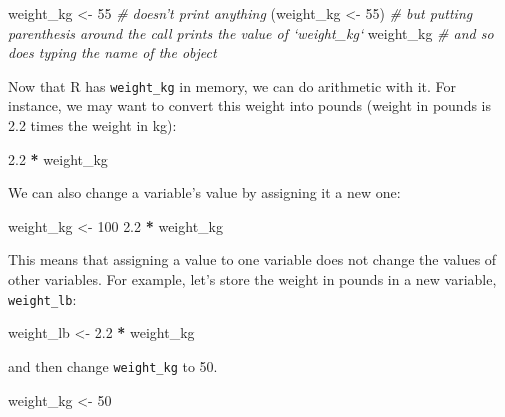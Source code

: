\documentclass[
]{book}
\newenvironment{Shaded}{\begin{snugshade}}{\end{snugshade}}
\newcommand{\CommentTok}[1]{\textcolor[rgb]{0.56,0.35,0.01}{\textit{#1}}}
\newcommand{\DecValTok}[1]{\textcolor[rgb]{0.00,0.00,0.81}{#1}}
\newcommand{\FloatTok}[1]{\textcolor[rgb]{0.00,0.00,0.81}{#1}}
\newcommand{\NormalTok}[1]{#1}
\newcommand{\OperatorTok}[1]{\textcolor[rgb]{0.81,0.36,0.00}{\textbf{#1}}}
\newcommand{\StringTok}[1]{\textcolor[rgb]{0.31,0.60,0.02}{#1}}
\begin{document}
\begin{Shaded}
\begin{Highlighting}[]
\NormalTok{weight_kg <-}\StringTok{ }\DecValTok{55}    \CommentTok{# doesn't print anything}
\NormalTok{(weight_kg <-}\StringTok{ }\DecValTok{55}\NormalTok{)  }\CommentTok{# but putting parenthesis around the call prints the value of `weight_kg`}
\NormalTok{weight_kg          }\CommentTok{# and so does typing the name of the object}
\end{Highlighting}
\end{Shaded}

Now that R has \texttt{weight\_kg} in memory, we can do arithmetic with it. For
instance, we may want to convert this weight into pounds (weight in pounds is 2.2 times the weight in kg):

\begin{Shaded}
\begin{Highlighting}[]
\FloatTok{2.2} \OperatorTok{*}\StringTok{ }\NormalTok{weight_kg}
\end{Highlighting}
\end{Shaded}

We can also change a variable's value by assigning it a new one:

\begin{Shaded}
\begin{Highlighting}[]
\NormalTok{weight_kg <-}\StringTok{ }\DecValTok{100}
\FloatTok{2.2} \OperatorTok{*}\StringTok{ }\NormalTok{weight_kg}
\end{Highlighting}
\end{Shaded}

This means that assigning a value to one variable does not change the values of
other variables. For example, let's store the weight in pounds in a new
variable, \texttt{weight\_lb}:

\begin{Shaded}
\begin{Highlighting}[]
\NormalTok{weight_lb <-}\StringTok{ }\FloatTok{2.2} \OperatorTok{*}\StringTok{ }\NormalTok{weight_kg}
\end{Highlighting}
\end{Shaded}

and then change \texttt{weight\_kg} to 50.

\begin{Shaded}
\begin{Highlighting}[]
\NormalTok{weight_kg <-}\StringTok{ }\DecValTok{50}
\end{Highlighting}
\end{Shaded}
\end{document}
